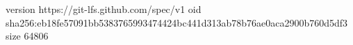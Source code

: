 version https://git-lfs.github.com/spec/v1
oid sha256:eb18fe57091bb5383765993474424bc441d313ab78b76ae0aca2900b760d5df3
size 64806
